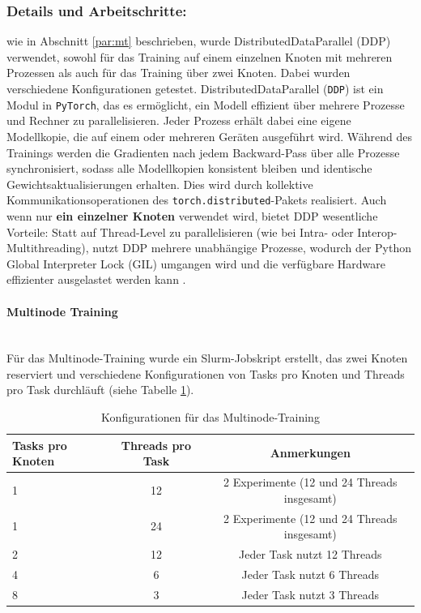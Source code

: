 \documentclass{article}
\begin{document}
\subsubsection{Details und Arbeitschritte:}
wie in Abschnitt \ref{par:mt} beschrieben, wurde DistributedDataParallel (DDP) verwendet, sowohl
für das Training auf einem einzelnen Knoten mit mehreren Prozessen als auch für das Training über zwei Knoten. Dabei wurden 
verschiedene Konfigurationen getestet. DistributedDataParallel (\texttt{DDP}) ist ein Modul in \texttt{PyTorch}, das es ermöglicht, ein Modell effizient über mehrere Prozesse und Rechner zu parallelisieren. 
Jeder Prozess erhält dabei eine eigene Modellkopie, die auf einem oder mehreren Geräten ausgeführt wird. 
Während des Trainings werden die Gradienten nach jedem Backward-Pass über alle Prozesse synchronisiert, 
sodass alle Modellkopien konsistent bleiben und identische Gewichtsaktualisierungen erhalten. 
Dies wird durch kollektive Kommunikationsoperationen des \texttt{torch.distributed}-Pakets realisiert. Auch wenn nur \textbf{ein einzelner Knoten} verwendet wird, bietet DDP wesentliche Vorteile: 
Statt auf Thread-Level zu parallelisieren (wie bei Intra- oder Interop-Multithreading), nutzt DDP mehrere unabhängige Prozesse, 
wodurch der Python Global Interpreter Lock (GIL) umgangen wird und die verfügbare Hardware 
effizienter ausgelastet werden kann \parencite{pytorch_ddp_tutorial}. 

\paragraph{Multinode Training} \mbox{}\\
Für das Multinode-Training wurde ein Slurm-Jobskript erstellt,
das zwei Knoten reserviert und verschiedene Konfigurationen von Tasks pro Knoten und Threads pro 
Task durchläuft (siehe Tabelle \ref{tab:multinode_configs}). 

\begin{table}[H]
\centering
\caption{Konfigurationen für das Multinode-Training}
\label{tab:multinode_configs}
\begin{tabular}{lcc}
\toprule
\textbf{Tasks pro Knoten} & \textbf{Threads pro Task} & \textbf{Anmerkungen} \\
\midrule
1 & 12 & 2 Experimente (12 und 24 Threads insgesamt) \\
1 & 24 & 2 Experimente (12 und 24 Threads insgesamt) \\
2 & 12 & Jeder Task nutzt 12 Threads \\
4 & 6  & Jeder Task nutzt 6 Threads \\
8 & 3  & Jeder Task nutzt 3 Threads \\
\bottomrule
\end{tabular}
\end{table}
\end{document}
